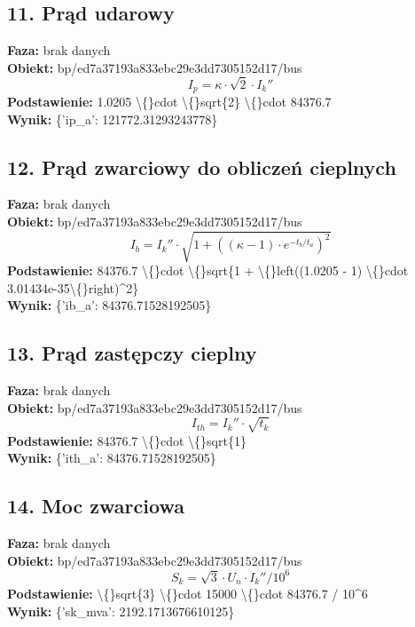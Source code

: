 ﻿\documentclass[11pt]{article}
\begin{document}
\subsection*{11. Prąd udarowy}
\textbf{Faza:} brak danych\\
\textbf{Obiekt:} bp/ed7a37193a833ebc29e3dd7305152d17/bus\\
\[
I_p = \kappa \cdot \sqrt{2} \cdot I_{k}''
\]
\textbf{Podstawienie:} 1.0205 \textbackslash\{\}cdot \textbackslash\{\}sqrt\{2\} \textbackslash\{\}cdot 84376.7\\
\textbf{Wynik:} \{'ip\_a': 121772.31293243778\}\\
\subsection*{12. Prąd zwarciowy do obliczeń cieplnych}
\textbf{Faza:} brak danych\\
\textbf{Obiekt:} bp/ed7a37193a833ebc29e3dd7305152d17/bus\\
\[
I_b = I_{k}'' \cdot \sqrt{1 + ((\kappa - 1) \cdot e^{-t_b/t_a})^2}
\]
\textbf{Podstawienie:} 84376.7 \textbackslash\{\}cdot \textbackslash\{\}sqrt\{1 + \textbackslash\{\}left((1.0205 - 1) \textbackslash\{\}cdot 3.01434e-35\textbackslash\{\}right)\textasciicircum{}2\}\\
\textbf{Wynik:} \{'ib\_a': 84376.71528192505\}\\
\subsection*{13. Prąd zastępczy cieplny}
\textbf{Faza:} brak danych\\
\textbf{Obiekt:} bp/ed7a37193a833ebc29e3dd7305152d17/bus\\
\[
I_{th} = I_{k}'' \cdot \sqrt{t_k}
\]
\textbf{Podstawienie:} 84376.7 \textbackslash\{\}cdot \textbackslash\{\}sqrt\{1\}\\
\textbf{Wynik:} \{'ith\_a': 84376.71528192505\}\\
\subsection*{14. Moc zwarciowa}
\textbf{Faza:} brak danych\\
\textbf{Obiekt:} bp/ed7a37193a833ebc29e3dd7305152d17/bus\\
\[
S_k = \sqrt{3} \cdot U_n \cdot I_{k}'' / 10^6
\]
\textbf{Podstawienie:} \textbackslash\{\}sqrt\{3\} \textbackslash\{\}cdot 15000 \textbackslash\{\}cdot 84376.7 / 10\textasciicircum{}6\\
\textbf{Wynik:} \{'sk\_mva': 2192.1713676610125\}\\
\end{document}
